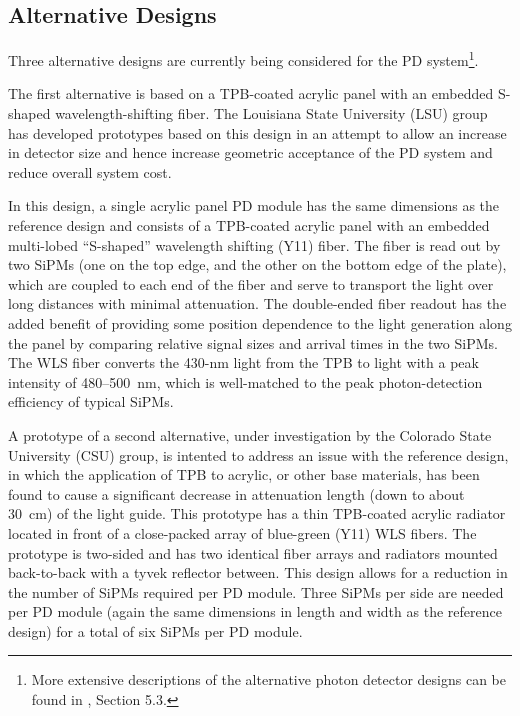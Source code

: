 \subsection{Alternative Designs} 

Three alternative designs are currently being considered for the PD
system\footnote{More extensive descriptions of the alternative photon
  detector designs can be found in \anxlbnefd, Section 5.3.}.

The first alternative is based on a TPB-coated acrylic panel with an
embedded S-shaped wavelength-shifting fiber. The Louisiana State
University (LSU) group has developed prototypes based on this design
in an attempt to allow an increase in detector size and hence increase
geometric acceptance of the PD system and reduce overall system
cost.

In this design, a single acrylic panel PD module has the same
dimensions as the reference design and consists of a TPB-coated
acrylic panel with an embedded multi-lobed ``S-shaped'' wavelength
shifting (Y11) fiber. The fiber is read out by two SiPMs (one on the
top edge, and the other on the bottom edge of the plate), which are
coupled to each %
end of the fiber and serve to transport the light
over long distances with minimal attenuation. The double-ended fiber
readout has the added benefit of providing some position dependence to
the light generation along the panel by comparing relative signal
sizes and arrival times in the two SiPMs. The WLS fiber converts the
430-nm light from the TPB to light with a peak intensity of
480--500~nm, which is well-matched to the peak photon-detection
efficiency of typical SiPMs.

A prototype of a second alternative, under investigation by the Colorado
State University (CSU) group, is intented to address an issue with the reference
design, in which the application of TPB to acrylic, or other base
materials, has been found to cause a significant decrease in
attenuation length (down to about 30~cm) of the light guide.
%
This prototype has a thin TPB-coated acrylic
radiator located in front of a close-packed array of blue-green (Y11) WLS fibers.  The
prototype is two-sided and has two identical fiber arrays and
radiators mounted back-to-back with a tyvek reflector between. This
design allows for a reduction in the number of SiPMs required per PD
module. Three SiPMs per side are needed per PD module (again the same
dimensions in length and width as the reference design) for a total of
six SiPMs per PD module.

